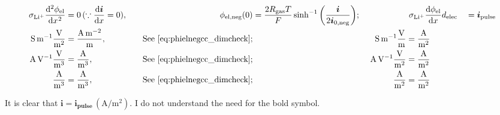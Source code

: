 \documentclass{article}
\begin{document}
\begin{alignat}{4}
    \sigma_\mathrm{Li^+}\diff[2]{\phi_\text{el}}{x} &= 0\, (\because \diff{\bm{i}}{x}=0),  &\qquad \phi_\text{el,neg}(0) &= \frac{2 R_\text{gas} T}{F} \sinh^{-1}\bigg(\frac{\bm{i}}{2 \bm{i_\text{0,neg}}}\bigg); &&\  \sigma_\mathrm{Li^+}\diff{\phi_\text{el}}{x}{d_\text{elec}} &&= \bm{i_\text{pulse}} \\
    \si{\siemens\per\metre}\frac{\si{\volt}}{\si{\meter\squared}} &= \frac{\si{\ampere\per\meter\squared}}{\si{\meter}}, &\quad \text{See}~\eqref{eq:phielnegcc_dimcheck}; &&\ \si{\siemens\per\meter}\frac{\si{\volt}}{\si{\meter}} &= \frac{\si{\ampere}}{\si{\meter\squared}} \\
    \si{\ampere\per\volt}\frac{\si{\volt}}{\si{\meter\cubed}} &= \frac{\si{\ampere}}{\si{\meter\cubed}}, &\quad \text{See}~\eqref{eq:phielnegcc_dimcheck}; &&\ \si{\ampere\per\volt}\frac{\si{\volt}}{\si{\meter\squared}} &= \frac{\si{\ampere}}{\si{\meter\squared}} \\
    \frac{\si{\ampere}}{\si{\meter\cubed}} &= \frac{\si{\ampere}}{\si{\meter\cubed}}, &\quad \text{See}~\eqref{eq:phielnegcc_dimcheck}; &&\ \frac{\si{\ampere}}{\si{\meter\squared}} &= \frac{\si{\ampere}}{\si{\meter\squared}} \\
\end{alignat}

It is clear that \(\bm{i} = \bm{i_\text{pulse}}\, (\si{\ampere\per\meter\squared})\). I do not understand the need for the bold symbol.

\bigskip
\end{document}

